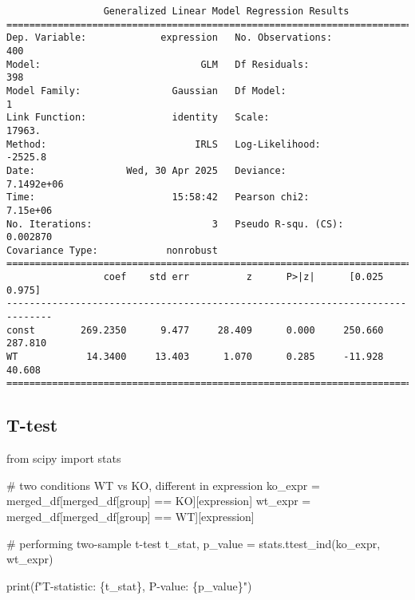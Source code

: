 \documentclass[
  letterpaper,
  DIV=11,
  numbers=noendperiod]{scrartcl}
\newenvironment{Shaded}{\begin{snugshade}}{\end{snugshade}}
\newcommand{\BuiltInTok}[1]{\textcolor[rgb]{0.00,0.23,0.31}{#1}}
\newcommand{\CommentTok}[1]{\textcolor[rgb]{0.37,0.37,0.37}{#1}}
\newcommand{\ImportTok}[1]{\textcolor[rgb]{0.00,0.46,0.62}{#1}}
\newcommand{\NormalTok}[1]{\textcolor[rgb]{0.00,0.23,0.31}{#1}}
\newcommand{\OperatorTok}[1]{\textcolor[rgb]{0.37,0.37,0.37}{#1}}
\newcommand{\SpecialCharTok}[1]{\textcolor[rgb]{0.37,0.37,0.37}{#1}}
\newcommand{\SpecialStringTok}[1]{\textcolor[rgb]{0.13,0.47,0.30}{#1}}
\newcommand{\StringTok}[1]{\textcolor[rgb]{0.13,0.47,0.30}{#1}}
\begin{document}
\begin{verbatim}
                 Generalized Linear Model Regression Results                  
==============================================================================
Dep. Variable:             expression   No. Observations:                  400
Model:                            GLM   Df Residuals:                      398
Model Family:                Gaussian   Df Model:                            1
Link Function:               identity   Scale:                          17963.
Method:                          IRLS   Log-Likelihood:                -2525.8
Date:                Wed, 30 Apr 2025   Deviance:                   7.1492e+06
Time:                        15:58:42   Pearson chi2:                 7.15e+06
No. Iterations:                     3   Pseudo R-squ. (CS):           0.002870
Covariance Type:            nonrobust                                         
==============================================================================
                 coef    std err          z      P>|z|      [0.025      0.975]
------------------------------------------------------------------------------
const        269.2350      9.477     28.409      0.000     250.660     287.810
WT            14.3400     13.403      1.070      0.285     -11.928      40.608
==============================================================================
\end{verbatim}

\subsection{T-test}\label{t-test}

\begin{Shaded}
\begin{Highlighting}[]
\ImportTok{from}\NormalTok{ scipy }\ImportTok{import}\NormalTok{ stats}

\CommentTok{\# two conditions WT vs KO, different in expression}
\NormalTok{ko\_expr }\OperatorTok{=}\NormalTok{ merged\_df[merged\_df[}\StringTok{\textquotesingle{}group\textquotesingle{}}\NormalTok{] }\OperatorTok{==} \StringTok{\textquotesingle{}KO\textquotesingle{}}\NormalTok{][}\StringTok{\textquotesingle{}expression\textquotesingle{}}\NormalTok{]}
\NormalTok{wt\_expr }\OperatorTok{=}\NormalTok{ merged\_df[merged\_df[}\StringTok{\textquotesingle{}group\textquotesingle{}}\NormalTok{] }\OperatorTok{==} \StringTok{\textquotesingle{}WT\textquotesingle{}}\NormalTok{][}\StringTok{\textquotesingle{}expression\textquotesingle{}}\NormalTok{]}

\CommentTok{\# performing two{-}sample t{-}test}
\NormalTok{t\_stat, p\_value }\OperatorTok{=}\NormalTok{ stats.ttest\_ind(ko\_expr, wt\_expr)}

\BuiltInTok{print}\NormalTok{(}\SpecialStringTok{f"T{-}statistic: }\SpecialCharTok{\{}\NormalTok{t\_stat}\SpecialCharTok{\}}\SpecialStringTok{, P{-}value: }\SpecialCharTok{\{}\NormalTok{p\_value}\SpecialCharTok{\}}\SpecialStringTok{"}\NormalTok{)}
\end{Highlighting}
\end{Shaded}
\end{document}
